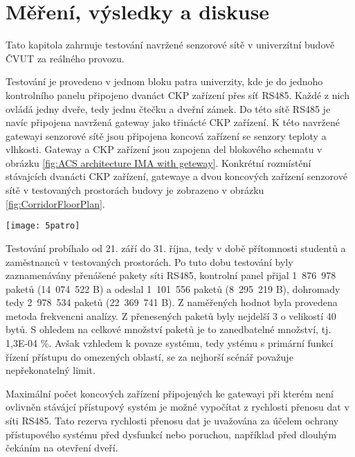 \chapter{Měření, výsledky a diskuse}
Tato kapitola zahrnuje testování navržené senzorové sítě v univerzítní budově ČVUT za reálného provozu.

Testování je provedeno v jednom bloku patra univerzity, kde je do jednoho kontrolního panelu připojeno dvanáct CKP zařízení přes síť RS485. Každé z nich ovládá jedny dveře, tedy jednu čtečku a dveřní zámek.
Do této sítě RS485 je navíc připojena navržená gateway jako třinácté CKP zařízení.
K této navržené gatewayi senzorové sítě jsou připojena koncová zařízení se senzory teploty a vlhkosti.
Gateway a CKP zařízení jsou zapojena del blokového schematu v obrázku \ref{fig:ACS architecture IMA with geteway}.
Konkrétní rozmístění stávajcích dvanácti CKP zařízení, gatewaye a dvou koncových zařízení senzorové sítě v testovaných prostorách budovy je zobrazeno v obrázku \ref{fig:CorridorFloorPlan}.

\begin{figure*}[!ht]
    \centering
    \texttt{[image: 5patro]}
    \caption{Rozmístění koncových zařízení sítě a zařízení CKP v testovaných prostorách budovy}
    \label{fig:CorridorFloorPlan}
\end{figure*}

Testování probíhalo od 21. září do 31. října, tedy v době přítomnosti studentů a zaměstnanců v testovaných prostorách. 
Po tuto dobu testování byly zaznamenávány přenášené pakety síti RS485, kontrolní panel přijal 1~876~978 paketů (14~074~522 B) a odeslal 1~101~556 paketů (8~295~219 B), dohromady tedy 2~978~534 paketů (22~369~741 B).
Z naměřených hodnot byla provedena metoda frekvencni analízy. Z přenesených paketů byly nejdelší 3 o velikostí 40 bytů.
S ohledem na celkové množství paketů je to zanedbatelné množství, tj. 1,3E-04 \%.
Avšak vzhledem k povaze systému, tedy ystému s primární funkcí řízení přístupu do omezených oblastí, se za nejhorší scénář považuje nepřekonatelný limit.

Maximální počet koncových zařízení připojených ke gatewayi při kterém není ovlivněn stávájcí přístupový systém je možné vypočítat z rychlosti přenosu dat v síti RS485. 
Tato rezerva rychlosti přenosu dat je uvažována za účelem ochrany přístupového systému před dysfunkcí nebo poruchou, například před dlouhým čekáním na otevření dveří.

